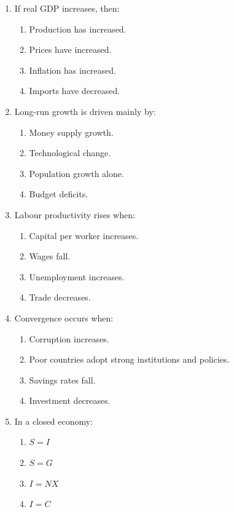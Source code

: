 \documentclass[12pt]{article}
\begin{document}
\begin{enumerate}[label=\textbf{\arabic*.}]
\item If real GDP increases, then:
\begin{enumerate}[label=(\Alph*)]
    \item Production has increased.
    \item Prices have increased.
    \item Inflation has increased.
    \item Imports have decreased.
\end{enumerate}

\item Long-run growth is driven mainly by:
\begin{enumerate}[label=(\Alph*)]
    \item Money supply growth.
    \item Technological change.
    \item Population growth alone.
    \item Budget deficits.
\end{enumerate}
\newpage

\item Labour productivity rises when:
\begin{enumerate}[label=(\Alph*)]
    \item Capital per worker increases.
    \item Wages fall.
    \item Unemployment increases.
    \item Trade decreases.
\end{enumerate}

\item Convergence occurs when:
\begin{enumerate}[label=(\Alph*)]
    \item Corruption increases.
    \item Poor countries adopt strong institutions and policies.
    \item Savings rates fall.
    \item Investment decreases.
\end{enumerate}

\item In a closed economy:
\begin{enumerate}[label=(\Alph*)]
    \item $S = I$
    \item $S = G$
    \item $I = NX$
    \item $I = C$
\end{enumerate}


\end{enumerate}
\end{document}
